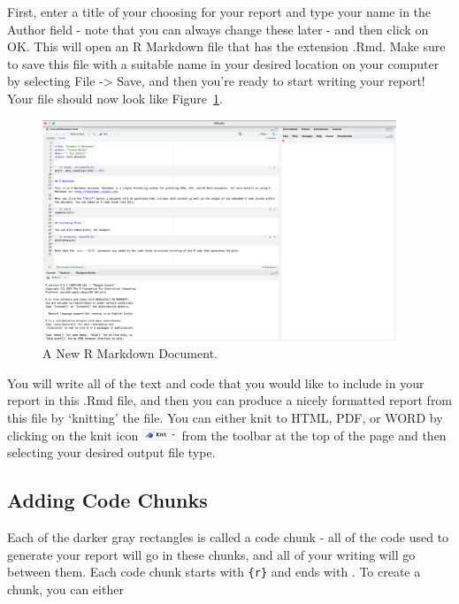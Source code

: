 \documentclass[
  letterpaper,
]{krantz}
\begin{document}
First, enter a title of your choosing for your report and type your name
in the Author field - note that you can always change these later - and
then click on OK. This will open an R Markdown file that has the
extension .Rmd. Make sure to save this file with a suitable name in your
desired location on your computer by selecting File -\textgreater{}
Save, and then you're ready to start writing your report! Your file
should now look like Figure~\ref{fig-rmarkdown-file}.

\begin{figure}

{\centering \includegraphics[width=4.16667in,height=\textheight]{book/images/12-r-markdown-file.png}

}

\caption{\label{fig-rmarkdown-file}A New R Markdown Document.}

\end{figure}

You will write all of the text and code that you would like to include
in your report in this .Rmd file, and then you can produce a nicely
formatted report from this file by `knitting' the file. You can either
knit to HTML, PDF, or WORD by clicking on the knit icon
\includegraphics[width=0.41667in,height=\textheight]{book/images/12-knit-icon.png}
from the toolbar at the top of the page and then selecting your desired
output file type.

\hypertarget{adding-code-chunks}{%
\subsection{Adding Code Chunks}\label{adding-code-chunks}}

Each of the darker gray rectangles is called a code chunk - all of the
code used to generate your report will go in these chunks, and all of
your writing will go between them. Each code chunk starts with
\texttt{\textasciigrave{}\textasciigrave{}\textasciigrave{}\{r\}} and
ends with \texttt{\textasciigrave{}\textasciigrave{}\textasciigrave{}}.
To create a chunk, you can either
\end{document}
